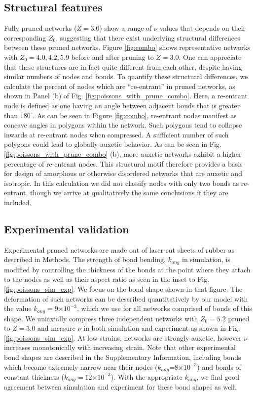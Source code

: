 \documentclass[9pt,twocolumn,twoside]{pnas-new}
\providecommand{\e}[1]{\ensuremath{\times 10^{#1}}}
\begin{document}
\subsection*{Structural features}
Fully pruned networks ($Z=3.0$) show a range of $\nu$ values that depends on their corresponding $Z_{0}$, suggesting that there exist underlying structural differences between these pruned networks.  Figure \ref{fig:combo} shows representative networks with $Z_{0}=4.0, 4.2, 5.9$ before and after pruning to $Z=3.0$. One can appreciate that these structures are in fact quite different from each other, despite having similar numbers of nodes and bonds.  To quantify these structural differences, we calculate the percent of nodes which are ``re-entrant'' in pruned networks, as shown in Panel (b) of Fig. \ref{fig:poissons_with_prune_combo}. Here, a re-entrant node is defined as one having an angle between adjacent bonds that is greater than $180^{\circ}$.  As can be seen in Figure \ref{fig:combo}, re-entrant nodes manifest as concave angles in polygons within the network.  Such polygons tend to collapse inwards at re-entrant nodes when compressed. A sufficient number of such polygons could lead to globally auxetic behavior.  As can be seen in Fig. \ref{fig:poissons_with_prune_combo} (b), more auxetic networks exhibit a higher percentage of re-entrant nodes.  This structural motif therefore provides a basis for design of amorphous or otherwise disordered networks that are auxetic and isotropic. In this calculation we did not classify nodes with only two bonds as re-entrant, though we arrive at qualitatively the same conclusions if they are included.




\subsection*{Experimental validation}

Experimental pruned networks are made out of laser-cut sheets of rubber\cite{rocks2017designing} as described in Methods.  The strength of bond bending, $k_{ang}$ in simulation, is modified by controlling the thickness of the bonds at the point where they attach to the nodes as well as their aspect ratio as seen in the inset to Fig. \ref{fig:poissons_sim_exp}. We focus on the bond shape shown in that figure. The deformation of such networks can be described quantitatively by our model with the value $k_{ang}=9\e{-3}$, which we use for all networks comprised of bonds of this shape.  We uniaxially compress three independent networks with $Z_{0}=5.2$ pruned to $Z=3.0$ and measure $\nu$ in both simulation and experiment as shown in Fig. \ref{fig:poissons_sim_exp}.  At low strains, networks are strongly auxetic, however $\nu$ increases monotonically with increasing strain.  Note that other experimental bond shapes are described in the Supplementary Information, including bonds which become extremely narrow near their nodes ($k_{ang}$=8\e{-3}) and bonds of constant thickness ($k_{ang}=12\e{-3}$).  With the appropriate $k_{ang}$, we find good agreement between simulation and experiment for these bond shapes as well.
\end{document}
